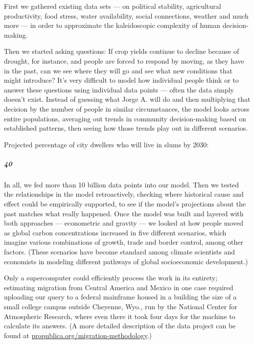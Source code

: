 First we gathered existing data sets --- on political stability,
agricultural productivity, food stress, water availability, social
connections, weather and much more --- in order to approximate the
kaleidoscopic complexity of human decision-making.

Then we started asking questions: If crop yields continue to decline
because of drought, for instance, and people are forced to respond by
moving, as they have in the past, can we see where they will go and see
what new conditions that might introduce? It's very difficult to model
how individual people think or to answer these questions using
individual data points --- often the data simply doesn't exist. Instead
of guessing what Jorge A. will do and then multiplying that decision by
the number of people in similar circumstances, the model looks across
entire populations, averaging out trends in community decision-making
based on established patterns, then seeing how those trends play out in
different scenarios.

Projected percentage of city dwellers who will live in slums by 2030:

\hypertarget{40}{%
\subparagraph{40}\label{40}}

In all, we fed more than 10 billion data points into our model. Then we
tested the relationships in the model retroactively, checking where
historical cause and effect could be empirically supported, to see if
the model's projections about the past matches what really happened.
Once the model was built and layered with both approaches ---
econometric and gravity --- we looked at how people moved as global
carbon concentrations increased in five different scenarios, which
imagine various combinations of growth, trade and border control, among
other factors. (These scenarios have become standard among climate
scientists and economists in modeling different pathways of global
socioeconomic development.)

Only a supercomputer could efficiently process the work in its entirety;
estimating migration from Central America and Mexico in one case
required uploading our query to a federal mainframe housed in a building
the size of a small college campus outside Cheyenne, Wyo., run by the
National Center for Atmospheric Research, where even there it took four
days for the machine to calculate its answers. (A more detailed
description of the data project can be found at
\href{http://propublica.org/migration-methodology}{propublica.org/migration-methodology}.)

